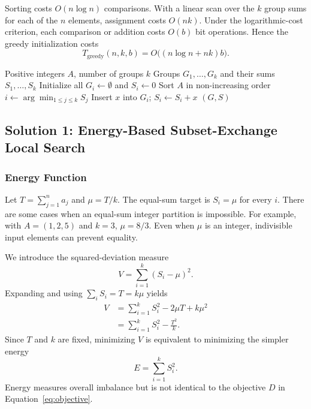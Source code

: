 \documentclass[11pt,a4paper]{article}
\begin{document}
Sorting costs $O(n\log n)$ comparisons. With a linear scan over the $k$ group sums for each of the $n$ elements, assignment costs $O(nk)$. Under the logarithmic-cost criterion, each comparison or addition costs $O(b)$ bit operations. Hence the greedy initialization costs
\begin{equation}\label{eq:greedy}
T_{\mathrm{greedy}}(n,k,b)=O\bigl((n\log n+nk)b\bigr).
\end{equation}

\begin{algorithm}[ht]
\caption{Greedy initialization}
\begin{algorithmic}[1]
\Require Positive integers $A$, number of groups $k$
\Ensure Groups $G_1,\ldots,G_k$ and their sums $S_1,\ldots,S_k$
\State Initialize all $G_i\gets\emptyset$ and $S_i\gets0$
\State Sort $A$ in non-increasing order
\State $i\gets\arg\min_{1\le j\le k}S_j$
\State Insert $x$ into $G_i$; $S_i\gets S_i+x$
\EndFor
\State \Return $(G,S)$
\end{algorithmic}
\end{algorithm}

\subsection{Solution 1: Energy-Based Subset-Exchange Local Search}
\subsubsection{Energy Function}
Let $T=\sum_{j=1}^{n}a_j$ and $\mu=T/k$. The equal-sum target is $S_i=\mu$ for every $i$. There are some cases when an equal-sum integer partition is impossible. For example, with $A=(1,2,5)$ and $k=3$, $\mu=8/3$. Even when $\mu$ is an integer, indivisible input elements can prevent equality.

We introduce the squared-deviation measure
\begin{equation}V=\sum_{i=1}^{k}(S_i-\mu)^2.\end{equation}
Expanding and using $\sum_iS_i=T=k\mu$ yields
\begin{align}
V&=\sum_{i=1}^{k}S_i^2-2\mu T+k\mu^2\\
 &=\sum_{i=1}^{k}S_i^2-\frac{T^2}{k}.
\end{align}
Since $T$ and $k$ are fixed, minimizing $V$ is equivalent to minimizing the simpler energy
\begin{equation}E=\sum_{i=1}^{k}S_i^2.\end{equation}
Energy measures overall imbalance but is not identical to the objective $D$ in Equation~\eqref{eq:objective}.
\end{document}
